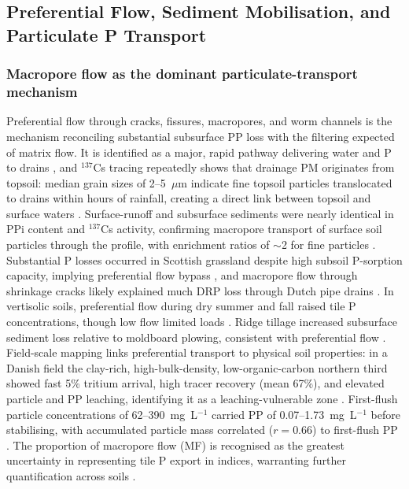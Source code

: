 \subsection{Preferential Flow, Sediment Mobilisation, and Particulate P Transport}

\subsubsection{Macropore flow as the dominant particulate-transport mechanism}

Preferential flow through cracks, fissures, macropores, and worm channels is the
mechanism reconciling substantial subsurface PP loss with the filtering expected of
matrix flow. It is identified as a major, rapid pathway delivering water and P to
drains \parencite{King2015,Sims1998}, and $^{137}$Cs tracing repeatedly shows that
drainage PM originates from topsoil: median grain sizes of 2--5~$\mu$m indicate fine
topsoil particles translocated to drains within hours of rainfall, creating a direct
link between topsoil and surface waters \parencite{Laubel1999}. Surface-runoff and
subsurface sediments were nearly identical in PPi content and $^{137}$Cs activity,
confirming macropore transport of surface soil particles through the profile, with
enrichment ratios of $\sim$2 for fine particles \parencite{Uusitalo2001}. Substantial
P losses occurred in Scottish grassland despite high subsoil P-sorption capacity,
implying preferential flow bypass \parencite{Hooda1999}, and macropore flow through
shrinkage cracks likely explained much DRP loss through Dutch pipe drains
\parencite{vanderSalm2012}. In vertisolic soils, preferential flow during dry summer
and fall raised tile P concentrations, though low flow limited loads
\parencite{Kokulan2021}. Ridge tillage increased subsurface sediment loss relative to
moldboard plowing, consistent with preferential flow \parencite{Zhao2001}. Field-scale
mapping links preferential transport to physical soil properties: in a Danish field
the clay-rich, high-bulk-density, low-organic-carbon northern third showed fast 5\%
tritium arrival, high tracer recovery (mean 67\%), and elevated particle and PP
leaching, identifying it as a leaching-vulnerable zone \parencite{Norgaard2013}.
First-flush particle concentrations of 62--390~mg~L$^{-1}$ carried PP of
0.07--1.73~mg~L$^{-1}$ before stabilising, with accumulated particle mass correlated
($r=0.66$) to first-flush PP \parencite{Norgaard2013}. The proportion of macropore
flow (MF) is recognised as the greatest uncertainty in representing tile P export in
indices, warranting further quantification across soils \parencite{Reid2012}.


